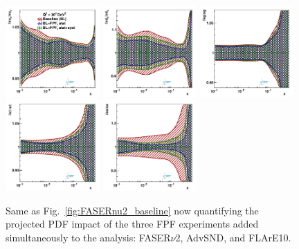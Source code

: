 \begin{figure}[t]
\centering
\includegraphics[width=0.32\textwidth]{plots/proton_fasernu2/FPF/fred05fcorr05_FPF_q2_10000_pdf_uv_ratio.pdf}
\includegraphics[width=0.32\textwidth]{plots/proton_fasernu2/FPF/fred05fcorr05_FPF_q2_10000_pdf_dv_ratio.pdf}
\includegraphics[width=0.32\textwidth]{plots/proton_fasernu2/FPF/fred05fcorr05_FPF_q2_10000_pdf_g_ratio.pdf}\\
\includegraphics[width=0.32\textwidth]{plots/proton_fasernu2/FPF/fred05fcorr05_FPF_q2_10000_pdf_Sea_ratio.pdf}
\includegraphics[width=0.32\textwidth]{plots/proton_fasernu2/FPF/fred05fcorr05_FPF_q2_10000_pdf_s_ratio.pdf}
\caption{
  Same as Fig.~\ref{fig:FASERnu2_baseline} now quantifying the
  projected PDF impact of the three FPF experiments added simultaneously to
  the analysis: FASER$\nu$2, AdvSND, and FLArE10. 
}
\label{fig:profiling_FPF}
\end{figure}

